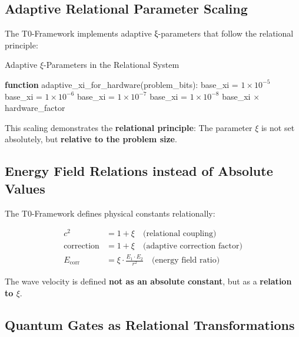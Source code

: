 \documentclass[11pt,a4paper]{article}
\begin{document}
	\subsection{Adaptive Relational Parameter Scaling}
	
	The T0-Framework implements adaptive ξ-parameters that follow the relational principle:
	
	\begin{algorithm}[htbp]
		\caption{Adaptive $\xi$-Parameters in the Relational System}
		\label{alg:adaptive_xi}
		\begin{algorithmic}[1]
			\STATE \textbf{function} adaptive\_xi\_for\_hardware(problem\_bits):
			\STATE base\_xi = $1 \times 10^{-5}$ 
			\STATE base\_xi = $1 \times 10^{-6}$ 
			\STATE base\_xi = $1 \times 10^{-7}$ 
			\ELSE
			\STATE base\_xi = $1 \times 10^{-8}$ 
			\ENDIF
			\RETURN base\_xi $\times$ hardware\_factor
		\end{algorithmic}
	\end{algorithm}
	
	This scaling demonstrates the \textbf{relational principle}: The parameter $\xi$ is not set absolutely, but \textbf{relative to the problem size}.
	
	\subsection{Energy Field Relations instead of Absolute Values}
	
	The T0-Framework defines physical constants relationally:
	
	\begin{align}
		c^2 &= 1 + \xi \quad \text{(relational coupling)} \\
		\text{correction} &= 1 + \xi \quad \text{(adaptive correction factor)} \\
		E_{\text{corr}} &= \xi \cdot \frac{E_1 \cdot E_2}{r^2} \quad \text{(energy field ratio)}
	\end{align}
	
	The wave velocity is defined \textbf{not as an absolute constant}, but as a \textbf{relation to $\xi$}.
	
	\subsection{Quantum Gates as Relational Transformations}
	
\end{document}
